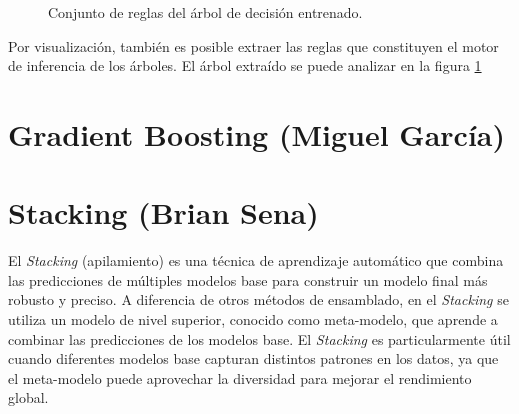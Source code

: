 \documentclass[12pt,letterpaper]{article}
\begin{document}
\begin{figure}[htp]
    \centering
    \caption{Conjunto de reglas del árbol de decisión entrenado.}
    \label{fig:decision_tree}
\end{figure}

Por visualización, también es posible extraer las reglas que constituyen el motor de inferencia de los árboles. El árbol extraído se puede analizar en la figura \ref{fig:decision_tree}

\section{Gradient Boosting (Miguel García)}
\section{Stacking (Brian Sena)}
El \textit{Stacking} (apilamiento) es una técnica de aprendizaje automático que combina las predicciones de múltiples modelos base para construir un modelo final más robusto y preciso. 
A diferencia de otros métodos de ensamblado, en el \textit{Stacking} se utiliza un modelo de nivel superior, conocido como meta-modelo, que aprende a combinar las predicciones de los modelos base.
El \textit{Stacking} es particularmente útil cuando diferentes modelos base capturan distintos patrones en los datos, ya que el meta-modelo puede aprovechar la diversidad para mejorar el rendimiento global. 
\end{document}
